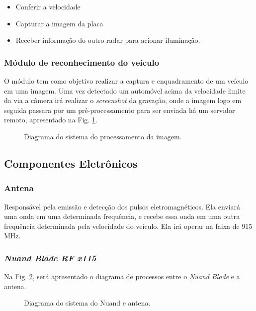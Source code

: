 \begin{itemize}
	\item Conferir a velocidade
	\item Capturar a imagem da placa
	\item Receber informação do outro radar para acionar iluminação.
\end{itemize}



\subsubsection{Módulo de reconhecimento do veículo}
 O módulo tem como objetivo realizar a captura e enquadramento de um veículo em uma imagem. Uma vez detectado um automóvel acima da velocidade limite da via a câmera irá realizar o \textit{screenshot} da gravação, onde a imagem logo em seguida passara por um pré-processamento para ser enviada há um servidor remoto, apresentado na Fig. \ref{fig:processos}.
 
 \begin{figure}[!htb]
	\caption{\label{fig:processos} Diagrama do sistema do processamento da imagem.}
\end{figure}

 
\subsection{Componentes Eletrônicos}

\subsubsection{Antena}

Responsável pela emissão e detecção dos pulsos eletromagnéticos. Ela enviará uma onda em uma determinada frequência, e recebe essa onda em uma outra frequência determinada pela velocidade do veículo. Ela irá operar na faixa de 915 MHz.

\subsubsection{\emph{Nuand Blade RF x115}}

Na Fig. \ref{fig:nuand}, será apresentado o diagrama de processos entre o \emph{Nuand Blade} e a antena.

 \begin{figure}[!htb]
	\caption{\label{fig:nuand} Diagrama do sistema do Nuand e antena.}
\end{figure}

